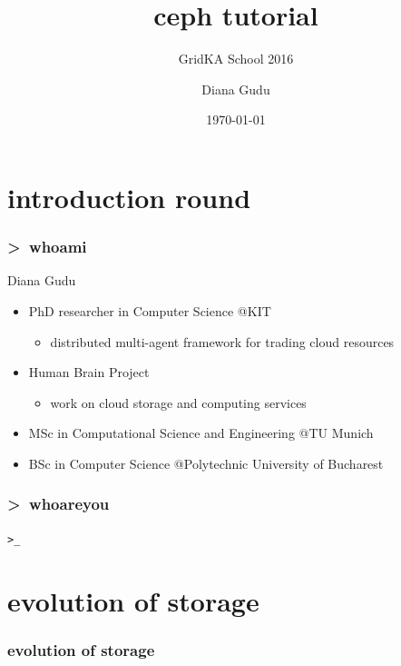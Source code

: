 \documentclass[10pt, compress]{beamer}
\title{ceph tutorial}
\subtitle{GridKA School 2016}
\date{\today}
\author{Diana Gudu}
\institute[KIT]{Karlsruhe Institute of Technology}
\begin{document}
\maketitle

\section{introduction round}
\begin{frame}[fragile]
    \frametitle{\textgreater~whoami}
    \begin{block}{Diana Gudu}
    \begin{itemize}
        \item PhD researcher in Computer Science @KIT
            \begin{itemize}
                \item distributed multi-agent framework for trading cloud 
                    resources
            \end{itemize}
        \item Human Brain Project
            \begin{itemize}
                \item work on cloud storage and computing services
            \end{itemize}
        \item MSc in Computational Science and Engineering @TU Munich
        \item BSc in Computer Science @Polytechnic University of Bucharest
    \end{itemize}
\end{block}
\end{frame}

\begin{frame}[fragile]
    \frametitle{\textgreater~whoareyou}
    \centering \texttt{\textgreater\_}
\end{frame}

\section{evolution of storage}
\begin{frame}[fragile]
  \frametitle{evolution of storage}
    \begin{center}
        
    \end{center}
\end{frame}
\end{document}
